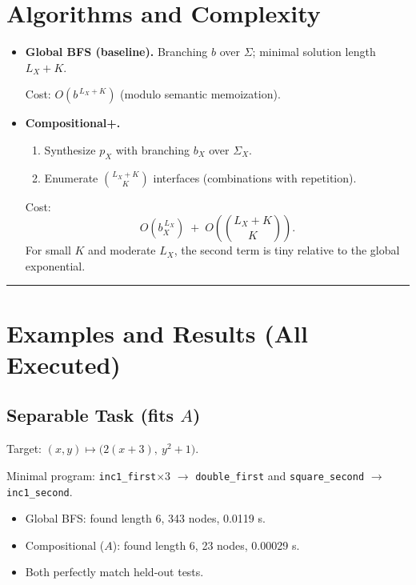 \documentclass[11pt]{article}
\begin{document}
\section{Algorithms and Complexity}
\begin{itemize}
    \item \textbf{Global BFS (baseline).} Branching $b$ over $\Sigma$; minimal solution length $L_X+K$.
    
    Cost: $O(b^{\,L_X+K})$ (modulo semantic memoization).
    
    \item \textbf{Compositional+.}
    \begin{enumerate}[label=(\roman*)]
        \item Synthesize $p_X$ with branching $b_X$ over $\Sigma_X$.
        \item Enumerate $\binom{L_X+K}{K}$ interfaces (combinations with repetition).
    \end{enumerate}
    Cost:
    \begin{equation}
    O(b_X^{\,L_X})\;+\;O\!\left(\binom{L_X+K}{K}\right).
    \end{equation}
    For small $K$ and moderate $L_X$, the second term is tiny relative to the global exponential.
\end{itemize}

\vspace{6pt}\noindent\rule{\textwidth}{0.4pt}\vspace{6pt}

\section{Examples and Results (All Executed)}

\subsection{Separable Task (fits $A$)}

Target: $(x,y)\mapsto\big(2(x+3),\ y^{2}+1\big)$.

Minimal program: \texttt{inc1\_first}$\times 3$ $\to$ \texttt{double\_first} and \texttt{square\_second} $\to$ \texttt{inc1\_second}.
\begin{itemize}
    \item Global BFS: found length 6, 343 nodes, 0.0119 s.
    \item Compositional ($A$): found length 6, 23 nodes, 0.00029 s.
    \item Both perfectly match held-out tests.
\end{itemize}
\end{document}
